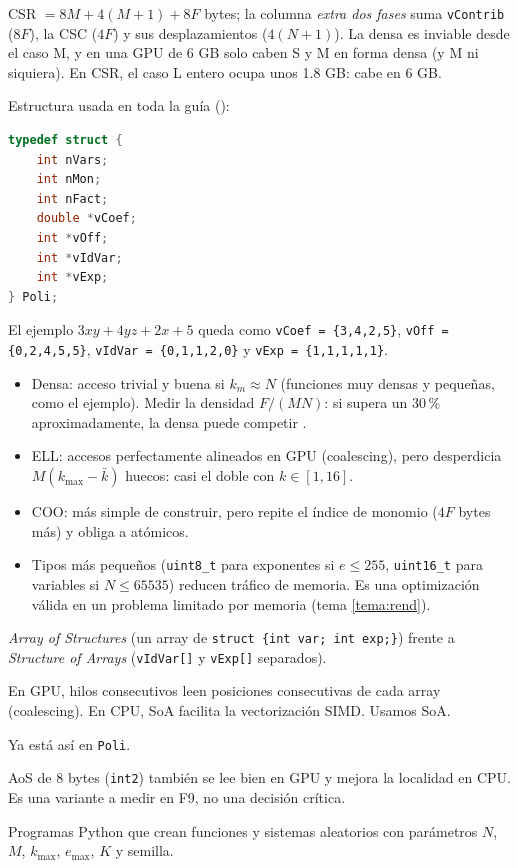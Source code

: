 CSR $=8M+4(M+1)+8F$ bytes; la columna \emph{extra dos fases} suma \texttt{vContrib} ($8F$), la CSC ($4F$) y sus desplazamientos ($4(N+1)$). La densa es inviable desde el caso M, y en una GPU de 6 GB solo caben S y M en forma densa (y M ni siquiera). En CSR, el caso L entero ocupa unos 1.8 GB: cabe en 6 GB.

\como Estructura usada en toda la guía ():
\begin{lstlisting}[language=C]
typedef struct {
    int nVars;
    int nMon;
    int nFact;
    double *vCoef;
    int *vOff;
    int *vIdVar;
    int *vExp;
} Poli;
\end{lstlisting}
El ejemplo $3xy+4yz+2x+5$ queda como \texttt{vCoef = \{3,4,2,5\}}, \texttt{vOff = \{0,2,4,5,5\}}, \texttt{vIdVar = \{0,1,1,2,0\}} y \texttt{vExp = \{1,1,1,1,1\}}.

\alt
\begin{itemize}
\item Densa: acceso trivial y buena si $k_m\approx N$ (funciones muy densas y pequeñas, como el ejemplo). Medir la densidad $F/(MN)$: si supera un 30\,\% aproximadamente, la densa puede competir \pv.
\item ELL: accesos perfectamente alineados en GPU (coalescing), pero desperdicia $M(k_{\max}-\bar k)$ huecos: casi el doble con $k\in[1,16]$.
\item COO: más simple de construir, pero repite el índice de monomio ($4F$ bytes más) y obliga a atómicos.
\item Tipos más pequeños (\texttt{uint8\_t} para exponentes si $e\le255$, \texttt{uint16\_t} para variables si $N\le65535$) reducen tráfico de memoria. Es una optimización válida en un problema limitado por memoria (tema \ref{tema:rend}).
\end{itemize}

\que \emph{Array of Structures} (un array de \texttt{struct \{int var; int exp;\}}) frente a \emph{Structure of Arrays} (\texttt{vIdVar[]} y \texttt{vExp[]} separados).

\porque En GPU, hilos consecutivos leen posiciones consecutivas de cada array (coalescing). En CPU, SoA facilita la vectorización SIMD. Usamos SoA.

\como Ya está así en \texttt{Poli}.

\alt AoS de 8 bytes (\texttt{int2}) también se lee bien en GPU y mejora la localidad en CPU. Es una variante a medir en F9, no una decisión crítica.

\que Programas Python que crean funciones y sistemas aleatorios con parámetros $N$, $M$, $k_{\max}$, $e_{\max}$, $K$ y semilla.

